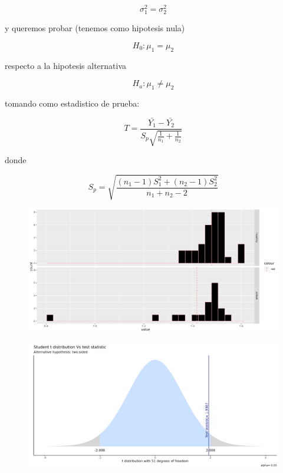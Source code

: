 $$\sigma_{1}^{2} = \sigma_{2}^{2}$$

y queremos probar (tenemos como hipotesis nula)

$$H_{0} : \mu_{1} = \mu _{2}$$

respecto a la hipotesis alternativa

$$H_{a} : \mu_{1} \neq \mu _{2}$$

tomando como estadistico de prueba:

$$ T = \frac{\bar{Y_{1}} - \bar{Y_{2}}}{S_{p}\sqrt{\frac{1}{n_{1}} + \frac{1}{n_{2}}}}$$

donde  

$$ S_{p} = \sqrt{\frac{(n_{1}-1)S_{1}^{2} + (n_{2}-1)S_{2}^{2}}{n_{1} + n_{2} - 2}}$$

\begin{figure}[!]
\centering
\includegraphics[width=\textwidth]{Img/cap2/medias_Shannon.png}
\caption{}
\end{figure}

\begin{figure}[!]
\centering
\includegraphics[width=\textwidth]{Img/cap2/pruebat_varianzasiguales_Shannon.png}
\caption{}
\end{figure}

